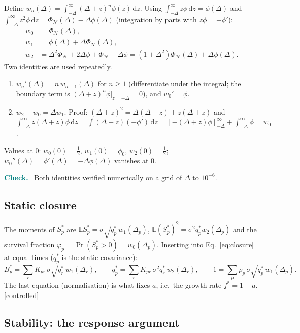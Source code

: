 \documentclass[11pt]{article}
\newcommand{\E}{\mathbb E}
\newcommand{\PhiN}{\Phi_{\mathcal N}}
\newcommand{\dd}{\mathrm d}
\newcommand{\controlled}{\textsf{\small[controlled]}}
\newenvironment{verify}{\par\medskip\noindent\textcolor{teal}{\textbf{Check.}}\ }{\par\medskip}
\begin{document}
Define $w_n(\Delta)=\int_{-\Delta}^\infty(\Delta+z)^n\phi(z)\,\dd z$.  Using $\int_{-\Delta}^\infty z\phi\,\dd z=\phi(\Delta)$ and
$\int_{-\Delta}^\infty z^2\phi\,\dd z=\PhiN(\Delta)-\Delta\phi(\Delta)$ (integration by parts with $z\phi=-\phi'$):
\begin{align}
w_0&=\PhiN(\Delta),\\
w_1&=\phi(\Delta)+\Delta\PhiN(\Delta),\\
w_2&=\Delta^2\PhiN+2\Delta\phi+\PhiN-\Delta\phi=(1+\Delta^2)\PhiN(\Delta)+\Delta\phi(\Delta).
\end{align}
Two identities are used repeatedly.
\begin{enumerate}
\item $w_n'(\Delta)=n\,w_{n-1}(\Delta)$ for $n\ge1$ (differentiate under the integral; the boundary term is
  $(\Delta+z)^n\phi|_{z=-\Delta}=0$), and $w_0'=\phi$.
\item $w_2-w_0=\Delta w_1$.  Proof: $(\Delta+z)^2=\Delta(\Delta+z)+z(\Delta+z)$ and
  $\int_{-\Delta}^\infty z(\Delta+z)\phi\,\dd z=\int(\Delta+z)(-\phi')\,\dd z=[-(\Delta+z)\phi]_{-\Delta}^\infty+\int_{-\Delta}^\infty\phi=w_0$.
\end{enumerate}
Values at $0$: $w_0(0)=\tfrac12$, $w_1(0)=\phi_0$, $w_2(0)=\tfrac12$; $w_0''(\Delta)=\phi'(\Delta)=-\Delta\phi(\Delta)$ vanishes at $0$.

\begin{verify}
Both identities verified numerically on a grid of $\Delta$ to $10^{-6}$.
\end{verify}

\subsection{Static closure}

The moments of $S_p^*$ are $\E S_p^*=\sigma\sqrt{q_p^*}\,w_1(\Delta_p)$, $\E(S_p^*)^2=\sigma^2q_p^*w_2(\Delta_p)$ and the
survival fraction $\varphi_p=\Pr(S_p^*>0)=w_0(\Delta_p)$.  Inserting into Eq.~\eqref{eq:closure} at equal times
($q_p^*$ is the static covariance):
\begin{equation}
B_p^*=\sum_rK_{pr}\,\sigma\sqrt{q_r^*}\,w_1(\Delta_r),\qquad
q_p^*=\sum_rK_{pr}\,\sigma^2q_r^*\,w_2(\Delta_r),\qquad
1=\sum_p\rho_p\,\sigma\sqrt{q_p^*}\,w_1(\Delta_p).
\label{eq:staticclosure}
\end{equation}
The last equation (normalisation) is what fixes $a$, i.e.\ the growth rate $f^*=1-a$.  \controlled

\subsection{Stability: the response argument}
\end{document}
